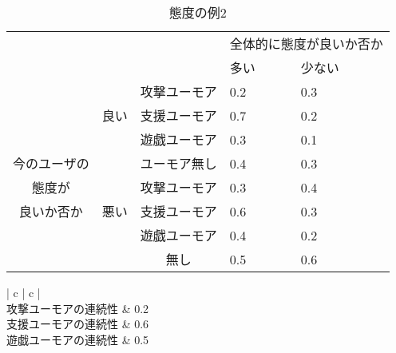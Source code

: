 \begin{table}
\begin{center}
\caption{態度の例2}
\label{tb:ex1taido}
\begin{tabular}{|c|c|c|p{6em}|p{6em}|}
\hline
\multicolumn{1}{|c}{} & \multicolumn{1}{c}{} & \multicolumn{1}{c|}{} & \multicolumn{2}{c|}{全体的に態度が良いか否か} \\\cline{4-5}
\multicolumn{1}{|c}{} & \multicolumn{1}{c}{} & \multicolumn{1}{c|}{} & \hspace{2zw}多い &\hspace{1.5zw}少ない \\\hline
 &  & 攻撃ユーモア & \hspace{2.4zw}0.2 & \hspace{2.4zw}0.3 \\\cline{3-5}
 & 良い & 支援ユーモア & \hspace{2.4zw}0.7 & \hspace{2.4zw}0.2 \\\cline{3-5}
 &  & 遊戯ユーモア & \hspace{2.4zw}0.3 & \hspace{2.4zw}0.1 \\\cline{3-5}
 今のユーザの &  & ユーモア無し & \hspace{2.4zw}0.4 & \hspace{2.4zw}0.3 \\\cline{2-5}
態度が &  & 攻撃ユーモア & \hspace{2.4zw}0.3 & \hspace{2.4zw}0.4 \\\cline{3-5}
良いか否か & 悪い & 支援ユーモア & \hspace{2.4zw}0.6 & \hspace{2.4zw}0.3 \\\cline{3-5}
 &  & 遊戯ユーモア & \hspace{2.4zw}0.4 & \hspace{2.4zw}0.2 \\\cline{3-5}
 &  & 無し & \hspace{2.4zw}0.5 & \hspace{2.4zw}0.6 \\\hline
\end{tabular}
\end{center}
\end{table}

\begin{table}[tb]
\begin{center}
\caption{ユーモアの連続性の例2}
\label{tb:ex1humor}
\begin{tabular}{| c | c |}
\hline
      \\\hline
     攻撃ユーモアの連続性 & 0.2 \\\hline
     支援ユーモアの連続性 & 0.6 \\\hline
	 遊戯ユーモアの連続性 & 0.5 \\\hline
     
\end{tabular}
\end{center}
\end{table}




